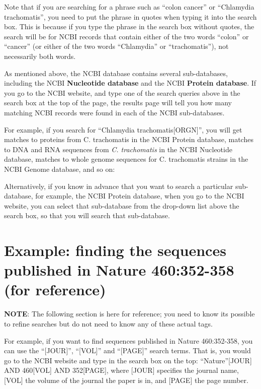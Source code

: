 \documentclass[
]{book}
\begin{document}
Note that if you are searching for a phrase such as ``colon cancer'' or ``Chlamydia trachomatis'', you need to put the phrase in quotes when typing it into the search box. This is because if you type the phrase in the search box without quotes, the search will be for NCBI records that contain either of the two words ``colon'' or ``cancer'' (or either of the two words ``Chlamydia'' or ``trachomatis''), not necessarily both words.

As mentioned above, the NCBI database contains several sub-databases, including the NCBI \textbf{Nucleotide database} and the NCBI \textbf{Protein database}. If you go to the NCBI website, and type one of the search queries above in the search box at the top of the page, the results page will tell you how many matching NCBI records were found in each of the NCBI sub-databases.

For example, if you search for ``Chlamydia trachomatis{[}ORGN{]}'', you will get matches to proteins from C. trachomatis in the NCBI Protein database, matches to DNA and RNA sequences from \emph{C. trachomatis} in the NCBI Nucleotide database, matches to whole genome sequences for C. trachomatis strains in the NCBI Genome database, and so on:

Alternatively, if you know in advance that you want to search a particular sub-database, for example, the NCBI Protein database, when you go to the NCBI website, you can select that sub-database from the drop-down list above the search box, so that you will search that sub-database.

\hypertarget{example-finding-the-sequences-published-in-nature-460352-358-for-reference}{%
\section{Example: finding the sequences published in Nature 460:352-358 (for reference)}\label{example-finding-the-sequences-published-in-nature-460352-358-for-reference}}

\textbf{NOTE}: The following section is here for reference; you need to know its possible to refine searches but do not need to know any of these actual tags.

For example, if you want to find sequences published in Nature 460:352-358, you can use the ``{[}JOUR{]}'', ``{[}VOL{]}'' and ``{[}PAGE{]}'' search terms. That is, you would go to the NCBI website and type in the search box on the top: ``Nature''{[}JOUR{]} AND 460{[}VOL{]} AND 352{[}PAGE{]}, where {[}JOUR{]} specifies the journal name, {[}VOL{]} the volume of the journal the paper is in, and {[}PAGE{]} the page number.
\end{document}

